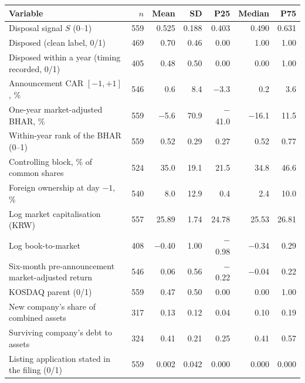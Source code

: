 \begin{tabular}{>{\raggedright\arraybackslash}p{6.6cm}rrrrrr}
\toprule
Variable & $n$ & Mean & SD & P25 & Median & P75 \\
\midrule
Disposal signal $S$ (0--1) & 559 & 0.525 & 0.188 & 0.403 & 0.490 & 0.631 \\
Disposed (clean label, 0/1) & 469 & 0.70 & 0.46 & 0.00 & 1.00 & 1.00 \\
Disposed within a year (timing recorded, 0/1) & 405 & 0.48 & 0.50 & 0.00 & 0.00 & 1.00 \\
Announcement CAR $[-1,+1]$, \% & 546 & 0.6 & 8.4 & $-$3.3 & 0.2 & 3.6 \\
One-year market-adjusted BHAR, \% & 559 & $-$5.6 & 70.9 & $-$41.0 & $-$16.1 & 11.5 \\
Within-year rank of the BHAR (0--1) & 559 & 0.52 & 0.29 & 0.27 & 0.52 & 0.77 \\
Controlling block, \% of common shares & 524 & 35.0 & 19.1 & 21.5 & 34.8 & 46.6 \\
Foreign ownership at day $-1$, \% & 540 & 8.0 & 12.9 & 0.4 & 2.4 & 10.0 \\
Log market capitalisation (KRW) & 557 & 25.89 & 1.74 & 24.78 & 25.53 & 26.81 \\
Log book-to-market & 408 & $-$0.40 & 1.00 & $-$0.98 & $-$0.34 & 0.29 \\
Six-month pre-announcement market-adjusted return & 546 & 0.06 & 0.56 & $-$0.22 & $-$0.04 & 0.22 \\
KOSDAQ parent (0/1) & 559 & 0.47 & 0.50 & 0.00 & 0.00 & 1.00 \\
New company's share of combined assets & 317 & 0.13 & 0.12 & 0.04 & 0.10 & 0.19 \\
Surviving company's debt to assets & 324 & 0.41 & 0.21 & 0.25 & 0.41 & 0.57 \\
Listing application stated in the filing (0/1) & 559 & 0.002 & 0.042 & 0.000 & 0.000 & 0.000 \\
\bottomrule
\end{tabular}
